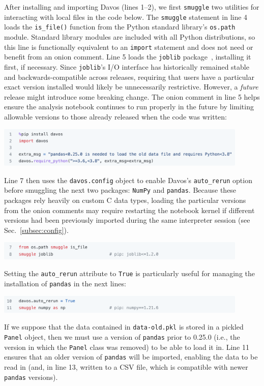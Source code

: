 \documentclass[preprint,12pt,a4paper]{elsarticle}
\begin{document}
After installing and importing Davos (lines 1--2), we first \texttt{smuggle} two
utilities for interacting with local files in the code below. The
\texttt{smuggle} statement in line 4 loads the \texttt{is\_file()}
function from the Python standard library's \texttt{os.path}
module. Standard library modules are included with all Python
distributions, so this line is functionally equivalent to an
\texttt{import} statement and does not need or benefit from an onion
comment. Line 5 loads the \texttt{joblib} package~\cite{Varo10},
installing it first, if necessary. Since \texttt{joblib}'s I/O
interface has historically remained stable and backwards-compatible
across releases, requiring that users have a particular exact version
installed would likely be unnecessarily restrictive. However, a
\textit{future} release might introduce some breaking change.  The
onion comment in line 5 helps ensure the analysis notebook continues
to run properly in the future by limiting allowable versions to those
already released when the code was written:
\begin{center}
\includegraphics[width=0.9\textwidth]{figs/example1}
\end{center}
Line 7 then uses the \texttt{davos.config} object to enable
Davos's \texttt{auto\_rerun} option before smuggling the next
two packages: \texttt{NumPy} and
\texttt{pandas}. Because these packages rely heavily on custom C data
types, loading the particular versions from the onion comments may
require restarting the notebook kernel if different versions had been previously
imported during the same interpreter session (see
Sec.~\ref{subsec:config}).
\begin{center}
\includegraphics[width=0.9\textwidth]{figs/example2}
\end{center}
Setting the \texttt{auto\_rerun} attribute to \texttt{True} is particularly useful
for managing the installation of \texttt{pandas} in the next
lines:
\begin{center}
\includegraphics[width=0.9\textwidth]{figs/example3}
\end{center}
If we suppose that the data contained in \texttt{data-old.pkl} is
stored in a pickled \texttt{Panel} object, then we must use a version of
\texttt{pandas} prior to 0.25.0 (i.e., the version in which the \texttt{Panel}
class was removed) to be able to load it in. Line 11 ensures
that an older version of \texttt{pandas} will be imported, enabling
the data to be read in (and, in line 13, written to a CSV
file, which is compatible with newer \texttt{pandas} versions).
\end{document}
